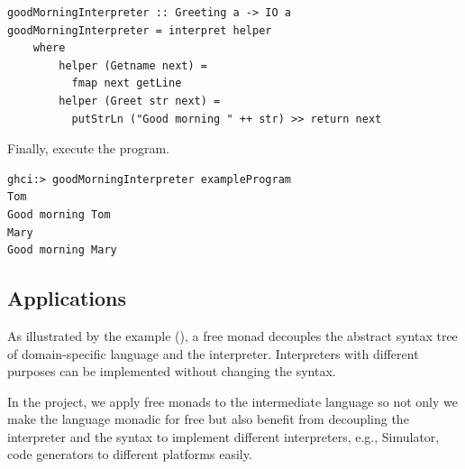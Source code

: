 \begin{verbatim}
goodMorningInterpreter :: Greeting a -> IO a
goodMorningInterpreter = interpret helper
    where
        helper (Getname next) = 
          fmap next getLine
        helper (Greet str next) =
          putStrLn ("Good morning " ++ str) >> return next  
\end{verbatim} 
Finally, execute the program.
\begin{verbatim}
ghci:> goodMorningInterpreter exampleProgram
Tom
Good morning Tom
Mary
Good morning Mary
\end{verbatim}

\subsection{Applications} \label{b:fm:a}
As illustrated by the example (), a free monad decouples the abstract syntax tree of domain-specific language and the interpreter. Interpreters with different purposes can be implemented without changing the syntax.

In the project, we apply free monads to the intermediate language so not only we make the language monadic for free but also benefit from decoupling the interpreter and the syntax to implement different interpreters, e.g., Simulator, code generators to different platforms easily.